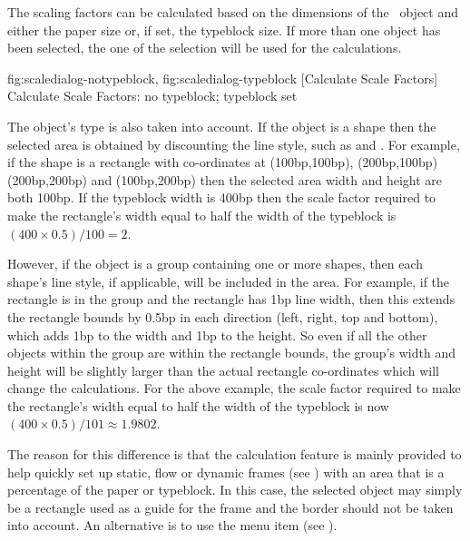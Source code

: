 The scaling factors can be calculated based on the dimensions of the
\selected\ object and either the paper size or, if set, the
\gls{typeblock} size. If more than one \gls{object} has been
selected, the  one of the selection
will be used for the calculations.

{
  {fig:scaledialog-notypeblock}{}{},
  {fig:scaledialog-typeblock}{}{}
}
[Calculate Scale Factors]
{Calculate Scale Factors:
 no typeblock; 
  typeblock set}

The object's type is also taken into account. If the object is a
\gls{shape} then the selected area is obtained by discounting the
line style, such as  and . 
For example, if the shape is a rectangle with
co-ordinates at (100\gls{bp},100\gls{bp}), (200\gls{bp},100\gls{bp})
(200\gls{bp},200\gls{bp}) and (100\gls{bp},200\gls{bp}) then the
selected area width and height are both 100\gls{bp}.
If the \gls{typeblock} width is 400\gls{bp} then the scale factor
required to make the rectangle's width equal to half the width of
the \gls{typeblock} is $(400 \times 0.5)/100 = 2$.

However, if the object is a group containing one or more
\glspl{shape}, then each shape's line style, if applicable, will be
included in the area. For example, if the rectangle is in the group
and the rectangle has 1\gls{bp} line width, then this extends the
rectangle bounds by 0.5\gls{bp} in each direction (left, right, top
and bottom), which adds 1\gls{bp} to the width and 1\gls{bp} to the
height. So even if all the other objects within the group are within
the rectangle bounds, the group's width and height will be slightly
larger than the actual rectangle co-ordinates which will change the
calculations.
For the above example, the scale factor
required to make the rectangle's width equal to half the width of
the \gls{typeblock} is now $(400 \times 0.5)/101 \approx 1.9802$.

The reason for this difference is that the calculation feature is mainly
provided to help quickly set up static, flow or dynamic frames (see
) with an area that is a percentage of the
paper or \gls{typeblock}. In this case, the selected object may
simply be a rectangle used as a guide for the frame and the border
should not be taken into account. An alternative is to use the
 menu item (see ).

